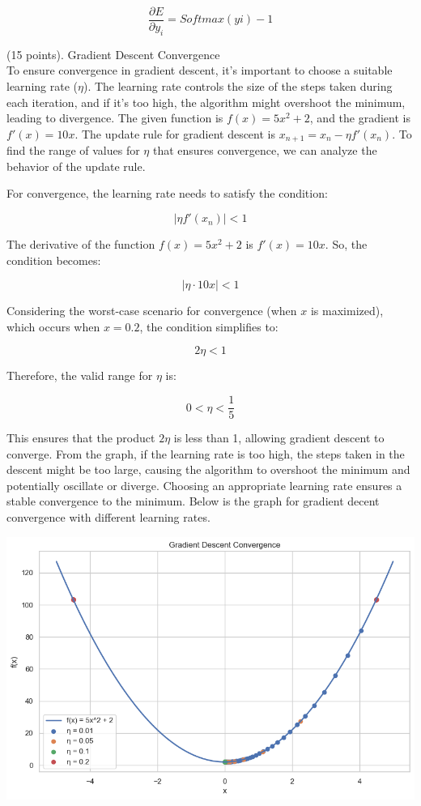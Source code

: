 \documentclass[11pt]{article}
\begin{document}
\begin{list}{{\bf Question }}
\[\frac{\partial E}{\partial y_{i}}=Softmax(yi) - 1\]




\item (15 points).  Gradient Descent Convergence \\


To ensure convergence in gradient descent, it's important to choose a suitable learning rate (\(\eta\)). The learning rate controls the size of the steps taken during each iteration, and if it's too high, the algorithm might overshoot the minimum, leading to divergence. The given function is \(f(x) = 5x^2 + 2\), and the gradient is \(f'(x) = 10x\). The update rule for gradient descent is \(x_{n+1} = x_n - \eta f'(x_n)\). To find the range of values for \(\eta\) that ensures convergence, we can analyze the behavior of the update rule.

For convergence, the learning rate needs to satisfy the condition:

\[
|\eta f'(x_n)| < 1
\]

The derivative of the function \(f(x) = 5x^2 + 2\) is \(f'(x) = 10x\). So, the condition becomes:

\[
|\eta \cdot 10x| < 1
\]

Considering the worst-case scenario for convergence (when \(x\) is maximized), which occurs when \(x = 0.2\), the condition simplifies to:

\[
2\eta < 1
\]

Therefore, the valid range for \(\eta\) is:

\[
0 < \eta < \frac{1}{5}
\]

This ensures that the product \(2\eta\) is less than 1, allowing gradient descent to converge. From the graph, if the learning rate is too high, the steps taken in the descent might be too large, causing the algorithm to overshoot the minimum and potentially oscillate or diverge. Choosing an appropriate learning rate ensures a stable convergence to the minimum. Below is the graph for gradient decent convergence with different learning rates.


\includegraphics[width=16cm]{output.png}


\end{list}
\end{document}
